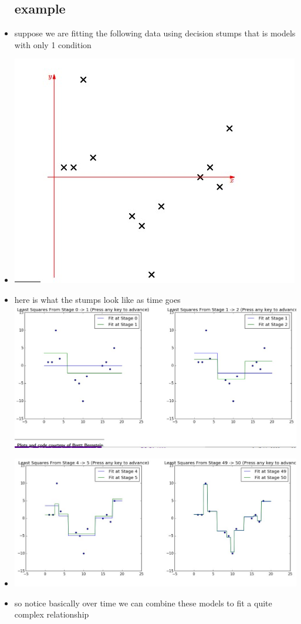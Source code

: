 \documentclass{article}
\begin{document}
\begin{itemize}
\subsection{example }
\item suppose we are fitting the following data using decision stumps that is models with only 1 condition 
\item \includegraphics{lecture_notes/lecture_10/immages/l10_2.jpg}
\item here is what the stumps look like as time goes 
\includegraphics{lecture_notes/lecture_10/immages/l10_3.jpg}
\item \includegraphics{lecture_notes/lecture_10/immages/l10_4.jpg}
\item so notice basically over time we can combine these models to fit a quite complex relationship

\end{itemize}
\end{document}
